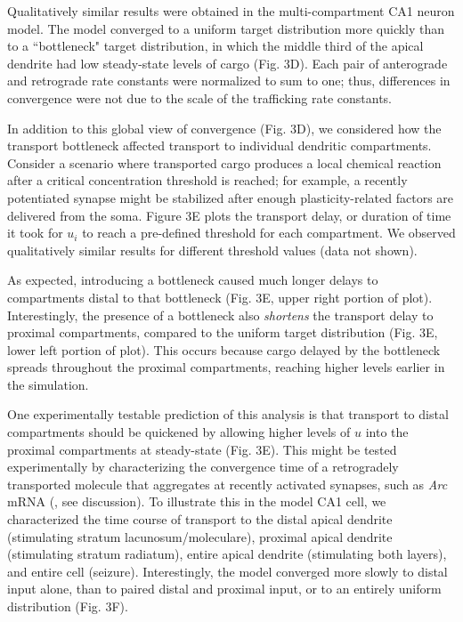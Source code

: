 \documentclass[10pt]{wlpeerj}
\begin{document}
Qualitatively similar results were obtained in the multi-compartment CA1 neuron model.
The model converged to a uniform target distribution more quickly than to a ``bottleneck" target distribution, in which the middle third of the apical dendrite had low steady-state levels of cargo (Fig. 3D).
Each pair of anterograde and retrograde rate constants were normalized to sum to one; thus, differences in convergence were not due to the scale of the trafficking rate constants.

In addition to this global view of convergence (Fig. 3D), we considered how the transport bottleneck affected transport to individual dendritic compartments.
Consider a scenario where transported cargo produces a local chemical reaction after a critical concentration threshold is reached; for example, a recently potentiated synapse might be stabilized after enough plasticity-related factors are delivered from the soma.
Figure 3E plots the transport delay, or duration of time it took for $u_i$ to reach a pre-defined threshold for each compartment.
We observed qualitatively similar results for different threshold values (data not shown).

As expected, introducing a bottleneck caused much longer delays to compartments distal to that bottleneck (Fig. 3E, upper right portion of plot).
Interestingly, the presence of a bottleneck also \textit{shortens} the transport delay to proximal compartments, compared to the uniform target distribution (Fig. 3E, lower left portion of plot).
This occurs because cargo delayed by the bottleneck spreads throughout the proximal compartments, reaching higher levels earlier in the simulation.

One experimentally testable prediction of this analysis is that transport to distal compartments should be quickened by allowing higher levels of $u$ into the proximal compartments at steady-state (Fig. 3E).
This might be tested experimentally by characterizing the convergence time of a retrogradely transported molecule that aggregates at recently activated synapses, such as \textit{Arc} mRNA (\citet{Steward_1998}, see discussion).
To illustrate this in the model CA1 cell, we characterized the time course of transport to the distal apical dendrite (stimulating stratum lacunosum/moleculare), proximal apical dendrite (stimulating stratum radiatum), entire apical dendrite (stimulating both layers), and entire cell (seizure). Interestingly, the model converged more slowly to distal input alone, than to paired distal and proximal input, or to an entirely uniform distribution (Fig. 3F).
\end{document}
